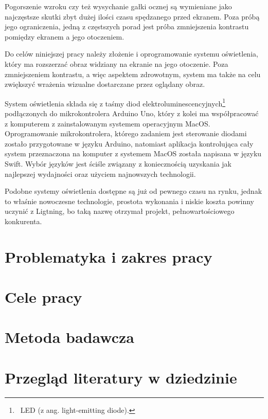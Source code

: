 \documentclass[12pt]{report}
\begin{document}
Pogorszenie wzroku czy też wysychanie gałki ocznej są wymieniane jako naj\-częstsze skutki zbyt dużej ilości czasu spędzanego przed ekranem. Poza próbą jego ograniczenia, jedną z częstszych porad jest próba zmniejszenia kontrastu pomiędzy ekranem a jego otoczeniem.

Do celów niniejszej pracy należy złożenie i oprogramowanie systemu oświetlenia, który ma rozszerzać obraz widziany na ekranie na jego otoczenie. Poza zmniejszeniem kontrastu, a więc aspektem zdrowotnym, system ma także na celu zwiększyć wrażenia wizualne dostarczane przez oglądany obraz.

System oświetlenia składa się z taśmy diod elektroluminescencyjnych\footnote{~LED (z ang. light-emitting diode).} pod\-łączonych do mikrokontrolera Arduino Uno, który z kolei ma współpracować z komputerem z zainstalowanym systemem operacyjnym MacOS. Oprogramowanie mikrokontrolera, którego zadaniem jest sterowanie diodami zostało przygotowane w języku Arduino, natomiast aplikacja kontrolująca cały system przeznaczona na komputer z systemem MacOS została napisana w języku Swift. Wybór języków jest ściśle związany z koniecznością uzyskania jak najlepszej wydajności oraz użyciem najnowszych technologii.

Podobne systemy oświetlenia dostępne są już od pewnego czasu na rynku, jednak to właśnie nowoczesne technologie, prostota wykonania i niskie koszta powinny uczynić z Ligtning, bo taką nazwę otrzymał projekt, pełnowartościowego konkurenta.

\section{Problematyka i zakres pracy}

\section{Cele pracy}

\section{Metoda badawcza}

\section{Przegląd literatury w dziedzinie}
\end{document}
